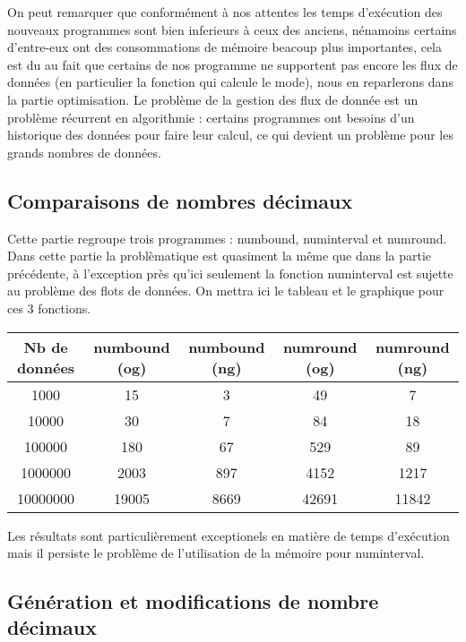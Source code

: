 On peut remarquer que conformément à nos attentes les temps d'exécution des nouveaux programmes sont bien inferieurs à ceux des anciens, nénamoins certains d'entre-eux ont des consommations de mémoire beacoup plus importantes, cela est du au fait que certains de nos programme ne supportent pas encore les flux de données (en particulier la fonction qui calcule le mode), nous en reparlerons dans la partie optimisation.
Le problème de la gestion des flux de donnée est un problème récurrent en algorithmie : certains programmes ont besoins d'un historique des données pour faire leur calcul, ce qui devient un problème pour les grands nombres de données.

\subsection{Comparaisons de nombres d\'ecimaux}

Cette partie regroupe trois programmes : numbound, numinterval et numround.
\newline
Dans cette partie la problèmatique est quasiment la même que dans la partie précédente, à l'exception près qu'ici seulement la fonction numinterval est sujette au problème des flots de données.
\newline
On mettra ici le tableau et le graphique pour ces 3 fonctions.

\begin{tabular}{|c|c|c|c|c|}

\hline
Nb de données & numbound (og) & numbound (ng) & numround (og) & numround (ng) \\
\hline
1000 & 15 & 3 & 49 & 7 \\
\hline
10000 & 30 & 7 & 84 & 18 \\
\hline
100000 & 180 & 67 & 529 & 89 \\
\hline
1000000 & 2003 & 897 & 4152 & 1217 \\
\hline
10000000 & 19005 & 8669 & 42691 & 11842 \\
\hline

\end{tabular}
\newline

Les résultats sont particulièrement exceptionels en matière de temps d'exécution mais il persiste le problème de l'utilisation de la mémoire pour numinterval.



\subsection{G\'en\'eration et modifications de nombre d\'ecimaux}

